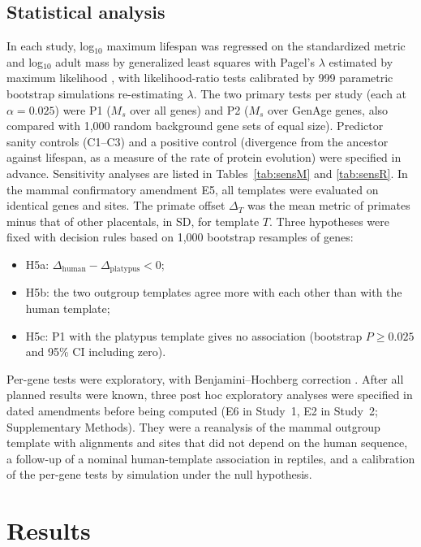 \documentclass[11pt]{article}
\begin{document}
\subsection{Statistical analysis}
In each study, log$_{10}$ maximum lifespan was regressed on the standardized metric and log$_{10}$ adult mass by generalized least squares with Pagel's $\lambda$ estimated by maximum likelihood \citep{Pagel1999,Freckleton2002}, with likelihood-ratio tests calibrated by 999 parametric bootstrap simulations re-estimating $\lambda$. The two primary tests per study (each at $\alpha=0.025$) were P1 ($M_s$ over all genes) and P2 ($M_s$ over GenAge genes, also compared with 1,000 random background gene sets of equal size). Predictor sanity controls (C1--C3) and a positive control (divergence from the ancestor against lifespan, as a measure of the rate of protein evolution) were specified in advance. Sensitivity analyses are listed in Tables~\ref{tab:sensM} and \ref{tab:sensR}. In the mammal confirmatory amendment E5, all templates were evaluated on identical genes and sites. The primate offset $\Delta_T$ was the mean metric of primates minus that of other placentals, in SD, for template $T$. Three hypotheses were fixed with decision rules based on 1,000 bootstrap resamples of genes:
\begin{itemize}[leftmargin=*,itemsep=0pt]
\item H5a: $\Delta_\mathrm{human} - \Delta_\mathrm{platypus} < 0$;
\item H5b: the two outgroup templates agree more with each other than with the human template;
\item H5c: P1 with the platypus template gives no association (bootstrap $P \geq 0.025$ and 95\% CI including zero).
\end{itemize} Per-gene tests were exploratory, with Benjamini--Hochberg correction \citep{Benjamini1995}. After all planned results were known, three post hoc exploratory analyses were specified in dated amendments before being computed (E6 in Study~1, E2 in Study~2; Supplementary Methods). They were a reanalysis of the mammal outgroup template with alignments and sites that did not depend on the human sequence, a follow-up of a nominal human-template association in reptiles, and a calibration of the per-gene tests by simulation under the null hypothesis.

\section{Results}
\end{document}
